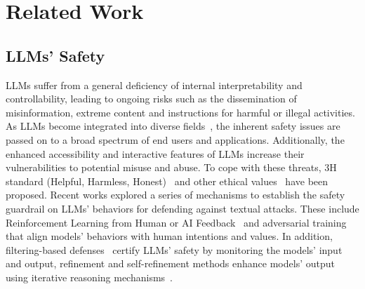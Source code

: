 \section{Related Work}
\subsection{LLMs’ Safety}
LLMs suffer from a general deficiency of internal interpretability and controllability, leading to ongoing risks such as the dissemination of misinformation, extreme content and instructions for harmful or illegal activities. As LLMs become integrated into diverse fields~\cite{DBLP:journals/corr/abs-2311-16673,Mumtaz2023LLMsHealthcareC,DBLP:journals/corr/abs-2311-06640}, the inherent safety issues are passed on to a broad spectrum of end users and applications. Additionally, the enhanced accessibility and interactive features of LLMs increase their vulnerabilities to potential misuse and abuse. To cope with these threats, 3H standard (Helpful, Harmless, Honest)~\cite{DBLP:journals/corr/abs-2112-00861} and other ethical values~\cite{DBLP:journals/corr/abs-2307-15217} have been proposed. Recent works explored a series of mechanisms to establish the safety guardrail on LLMs' behaviors for defending against textual attacks. These include Reinforcement Learning from Human or AI Feedback~\cite{DBLP:conf/nips/Ouyang0JAWMZASR22,DBLP:journals/corr/abs-2309-00267} and adversarial training~\cite{DBLP:journals/corr/abs-2307-01225,DBLP:journals/corr/abs-2308-09662,DBLP:journals/corr/abs-2307-16630} that align models’ behaviors with human intentions and values. In addition, filtering-based defenses~\cite{DBLP:journals/corr/abs-2309-00614,DBLP:journals/corr/abs-2309-02705,DBLP:journals/corr/abs-2308-07308} certify LLMs' safety by monitoring the models’ input and output, refinement and self-refinement methods enhance models’ output using iterative reasoning mechanisms~\cite{DBLP:conf/nips/MadaanTGHGW0DPY23,DBLP:conf/uai/2021,DBLP:journals/corr/abs-2305-13514}.

